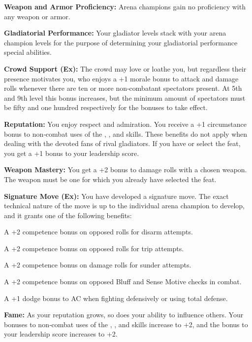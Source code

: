 {
\textbf{Weapon and Armor Proficiency:} Arena champions gain no proficiency with any weapon or armor.

\textbf{Gladiatorial Performance:} Your gladiator levels stack with your arena champion levels for the purpose of determining your gladiatorial performance special abilities.

\textbf{Crowd Support (Ex):} The crowd may love or loathe you, but regardless their presence motivates you, who enjoys a +1 morale bonus to attack and damage rolls whenever there are ten or more non‐combatant spectators present. At 5th and 9th level this bonus increases, but the minimum amount of spectators must be fifty and one hundred respectively for the bonuses to take effect.

\textbf{Reputation:} You enjoy respect and admiration. You receive a +1 circumstance bonus to non‐combat uses of the , ,  and  skills. These benefits do not apply when dealing with the devoted fans of rival gladiators. If you have or select the  feat, you get a +1 bonus to your leadership score.

\textbf{Weapon Mastery:} You get a +2 bonus to damage rolls with a chosen weapon. The weapon must be one for which you already have selected the  feat.

\textbf{Signature Move (Ex):} You have developed a signature move. The exact technical nature of the move is up to the individual arena champion to develop, and it grants one of the following benefits:
\begin{itemize*}
\item A +2 competence bonus on opposed rolls for disarm attempts.
\item A +2 competence bonus on opposed rolls for trip attempts.
\item A +2 competence bonus on damage rolls for sunder attempts.
\item A +2 competence bonus on opposed Bluff and Sense Motive checks in combat.
\item A +1 dodge bonus to AC when fighting defensively or using total defense.
\end{itemize*}

\textbf{Fame:} As your reputation grows, so does your ability to influence others. Your bonuses to non‐combat uses of the , ,  and  skills increase to +2, and the bonus to your leadership score increases to +2.

}
